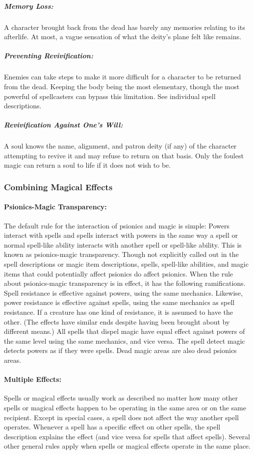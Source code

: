 \subparagraph{Memory Loss:} A character brought back from the dead has barely any memories relating to its afterlife. At most, a vague sensation of what the deity's plane felt like remains.

\subparagraph{Preventing Revivification:} 
Enemies can take steps to make it more difficult for a character to be returned from the dead. 
Keeping the body being the most elementary, though the most powerful of spellcasters can bypass this limitation. 
See individual spell descriptions.

\subparagraph{Revivification Against One's Will:} 
A soul knows the name, alignment, and patron deity (if any) of the character attempting to revive it and may refuse to return on that basis.
Only the foulest magic can return a soul to life if it does not wish to be.
\subsubsection{Combining Magical Effects}
\paragraph{Psionics-Magic Transparency:} The default rule for the interaction of psionics and magic is simple: 
Powers interact with spells and spells interact with powers in the same way a spell or normal spell-like ability interacts with another spell or spell-like ability. 
This is known as psionics-magic transparency.
Though not explicitly called out in the spell descriptions or magic item descriptions, 
spells, spell-like abilities, and magic items that could potentially affect psionics do affect psionics. 
When the rule about psionics-magic transparency is in effect, it has the following ramifications.
Spell resistance is effective against powers, using the same mechanics. 
Likewise, power resistance is effective against spells, using the same mechanics as spell resistance. 
If a creature has one kind of resistance, it is assumed to have the other. (The effects have similar ends despite having been brought about by different means.)
All spells that dispel magic have equal effect against powers of the same level using the same mechanics, and vice versa.
The spell detect magic detects powers as if they were spells.
Dead magic areas are also dead psionics areas.

\paragraph{Multiple Effects:} Spells or magical effects usually work as described no matter how many other spells 
or magical effects happen to be operating in the same area or on the same recipient. 
Except in special cases, a spell does not affect the way another spell operates. 
Whenever a spell has a specific effect on other spells, 
the spell description explains the effect (and vice versa for spells that affect spells). 
Several other general rules apply when spells or magical effects operate in the same place.

